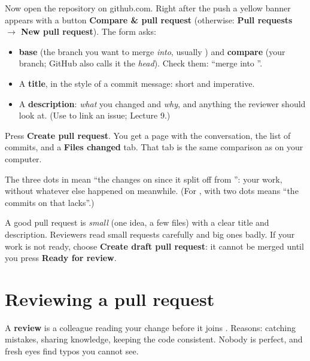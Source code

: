 Now open the repository on github.com. Right after the push a yellow banner appears with a button \textbf{Compare \& pull request} (otherwise: \textbf{Pull requests $\rightarrow$ New pull request}). The form asks:

\begin{itemize}
  \item \textbf{base} (the branch you want to merge \emph{into}, usually ) and \textbf{compare} (your branch; GitHub also calls it the \emph{head}). Check them: ``merge  into ''.
  \item A \textbf{title}, in the style of a commit message: short and imperative.
  \item A \textbf{description}: \emph{what} you changed and \emph{why}, and anything the reviewer should look at. (Use  to link an issue; Lecture 9.)
\end{itemize}

Press \textbf{Create pull request}. You get a page with the conversation, the list of commits, and a \textbf{Files changed} tab. That tab is the same comparison as  on your computer.

\begin{quickfact}
The three dots in  mean ``the changes on  since it split off from '': your work, without whatever else happened on  meanwhile. (For ,  with two dots means ``the commits on  that  lacks''.)
\end{quickfact}

\begin{quickfact}
A good pull request is \emph{small} (one idea, a few files) with a clear title and description. Reviewers read small requests carefully and big ones badly. If your work is not ready, choose \textbf{Create draft pull request}: it cannot be merged until you press \textbf{Ready for review}.
\end{quickfact}

\section{Reviewing a pull request}

A \textbf{review} is a colleague reading your change before it joins . Reasons: catching mistakes, sharing knowledge, keeping the code consistent. Nobody is perfect, and fresh eyes find typos you cannot see.

